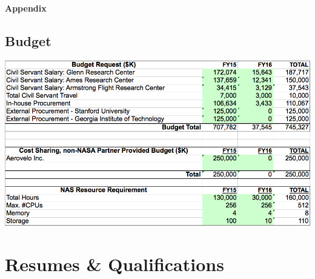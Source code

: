 \documentclass[]{aiaa-tc}
\begin{document}
  \clearpage
  

  \appendix

  \clearpage
  \centerline{\huge{\textbf{Appendix}}}

  \begin{landscape}
  \section{Budget}
    \centering
    \includegraphics[height=\textheight]{images/budget_request}
    \end{landscape}

  \clearpage
  \section{Resumes \& Qualifications}

    \clearpage
    
    \restoregeometry


    
    \restoregeometry
\end{document}
